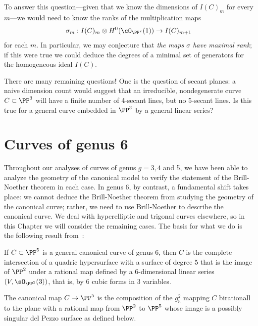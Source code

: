 To answer this question---given that we know the dimensions of $I(C)_m$ for every $m$---we would need to know the ranks of the multiplication maps
$$
\sigma_m : I(C)_m \otimes H^0(\cO_{\PP^r}(1)) \to I(C)_{m+1}
$$
for each $m$. In particular, we may conjecture that \emph{the maps $\sigma$ have maximal rank}; if this were true we could deduce the degrees of a minimal set of generators for the homogeneous ideal $I(C)$.


There are many remaining questions! One is the question of secant planes: a naive dimension count would suggest that an irreducible, nondegenerate curve $C \subset \PP^3$ will have a finite number of 4-secant lines, but no 5-secant lines. Is this true for a general curve embedded in $\PP^3$ by a general linear series?



\section{Curves of genus 6}\label{genus 6 section}


Throughout our analyses of curves of genus $g = 3, 4$ and 5, we have been able to analyze the geometry of the canonical model to verify the statement of the Brill-Noether theorem in each case. In genus 6, by contrast, a fundamental shift takes place: we cannot deduce the Brill-Noether theorem from studying the geometry of the canonical curve; rather, we need to use Brill-Noether to describe the canonical curve. We deal with hyperelliptic and trigonal curves elsewhere, so in this Chapter we will consider the remaining cases. The basis for what we do is the following result from~\cite{MR744297}:

\begin{theorem}
If $C\subset \PP^5$ is a general canonical curve of genus 6, then $C$ is the complete intersection of a quadric hypersurface
with a surface of degree 5 that is the image of $\PP^2$ under a rational map defined by a 6-dimensional linear series
$(V,\sO_{\PP^2}(3))$, that is, by 6 cubic forms in 3 variables. 

The canonical map $C\to \PP^5$ is the composition
of the $g^2_5$ mapping $C$ birationall to the plane with a rational map from $\PP^2$ to $\PP^5$ whose image is a 
possibly singular del Pezzo surface as defined below.
\end{theorem}


